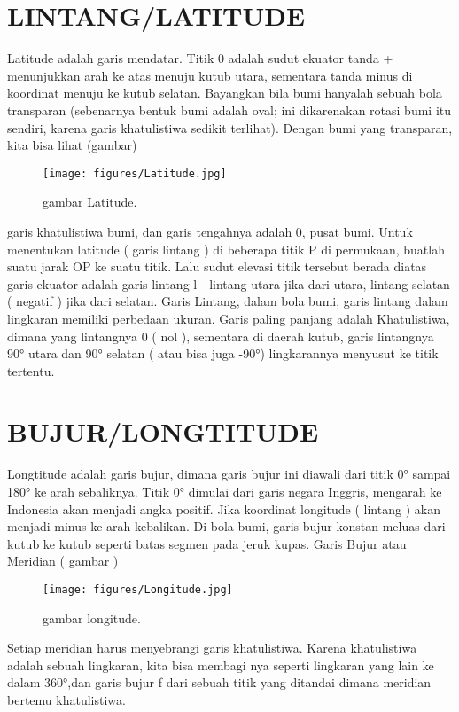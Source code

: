 \section{LINTANG/LATITUDE}

	Latitude adalah garis mendatar. Titik 0 adalah sudut ekuator tanda + menunjukkan arah ke atas menuju kutub utara,
	sementara tanda minus di koordinat menuju ke kutub selatan. Bayangkan bila bumi hanyalah sebuah bola transparan 
	(sebenarnya bentuk bumi adalah oval; ini dikarenakan rotasi bumi itu sendiri, karena garis khatulistiwa sedikit 
	terlihat). Dengan bumi yang transparan, kita bisa lihat (gambar)
	\begin{figure}[ht]
	\centerline{\texttt{[image: figures/Latitude.jpg]}}
	\caption{gambar Latitude.}
	\label{Gambar Latitude}
	\end{figure}
	garis khatulistiwa bumi, dan garis tengahnya adalah
	0, pusat bumi. Untuk menentukan latitude ( garis lintang ) di beberapa titik P di permukaan, buatlah suatu jarak OP 
	ke suatu titik. Lalu sudut elevasi titik tersebut berada diatas garis ekuator adalah garis lintang l - lintang utara
	jika dari utara, lintang selatan ( negatif ) jika dari selatan. 
	Garis Lintang, dalam bola bumi, garis lintang dalam lingkaran memiliki perbedaan ukuran. Garis paling panjang adalah 
	Khatulistiwa, dimana yang lintangnya 0 ( nol ), sementara di daerah kutub, garis lintangnya 90° utara dan 90° selatan
	( atau bisa juga -90°) lingkarannya menyusut ke titik tertentu.

\section{BUJUR/LONGTITUDE}

	Longtitude adalah garis bujur, dimana garis bujur ini diawali dari titik 0° sampai 180° ke arah sebaliknya. Titik 0° dimulai dari
	garis negara Inggris, mengarah ke Indonesia akan menjadi angka positif. Jika koordinat longitude ( lintang ) akan menjadi minus 
	ke arah kebalikan. Di bola bumi, garis bujur konstan meluas dari kutub ke kutub seperti batas segmen pada jeruk kupas. Garis Bujur atau
	Meridian ( gambar )
	\begin{figure}[ht]
	\centerline{\texttt{[image: figures/Longitude.jpg]}}
	\caption{gambar longitude.}
	\label{Gambar Longitude}
	\end{figure}
	

	Setiap meridian harus menyebrangi garis khatulistiwa. Karena khatulistiwa adalah sebuah lingkaran, kita bisa membagi nya seperti lingkaran
	yang lain ke dalam 360°,dan garis bujur f dari sebuah titik yang ditandai dimana meridian bertemu khatulistiwa.

